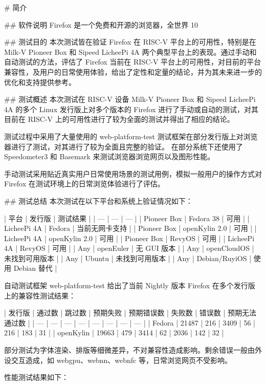 \documentclass{article}
\begin{document}
\begin{markdown}

# 简介

## 软件说明
Firefox 是一个免费和开源的浏览器，全世界 10%

## 测试目的
本次测试皆在验证 Firefox 在 RISC-V 平台上的可用性，特别是在 Milk-V Pioneer Box 和 Sipeed LicheePi 4A 两个典型平台上的表现。通过手动和自动测试的方法，评估了 Firefox 当前在 RISC-V 平台上的可用性，对目前的平台兼容性，及用户的日常使用体验，给出了定性和定量的结论，并为其未来进一步的优化和支持提供参考。

## 测试概述
本次测试在 RISC-V 设备 Milk-V Pioneer Box 和 Sipeed LicheePi 4A 的多个 Linux 发行版上对多个版本的 Firefox 进行了手动或自动的测试，对其目前在 RISC-V 上的可用性进行了较为全面的测试并得出了相应的结论。

测试过程中采用了大量使用的 web-platform-test 测试框架在部分发行版上对浏览器进行了测试，对其进行了较为全面且完整的验证。
在部分系统下还使用了 Speedometer3 和 Basemark 来测试浏览器浏览网页以及图形性能。

手动测试采用贴近真实用户日常使用场景的测试用例，模拟一般用户的操作方式对 Firefox 在测试环境上的日常浏览体验进行了评估。

## 测试总结
本次测试在以下平台和系统上验证情况如下：

| 平台 | 发行版 | 测试结果 |
| --- | --- | --- |
| Pioneer Box | Fedora 38 | 可用 |
| LicheePi 4A | Fedora | 当前无网卡支持 |
| Pioneer Box | openKylin 2.0 | 可用 |
| LicheePi 4A | openKylin 2.0 | 可用 |
| Pioneer Box | RevyOS | 可用 |
| LicheePi 4A | RevyOS | 可用 |
| Any | openEuler | 无 GUI 版本 |
| Any | openCloudOS | 未找到可用版本 |
| Any | Ubuntu | 未找到可用版本 |
| Any | Debian/RuyiOS | 使用 Debian 替代 | 

自动测试框架 web-platform-test 给出了当前 Nightly 版本 Firefox 在多个发行版上的兼容性测试结果：

| 发行版 | 通过数 | 跳过数 | 预期失败 | 预期错误数 | 失败数 | 错误数 | 预期无法通过数 |
| --- | --- | --- | --- | --- | --- | --- | --- |
| Fedora | 21487 | 216 | 3409 | 56 | 216 | 183 | 31 |
| openKylin | 19663 | 479 | 3414 | 62 | 2036 | 142 | 32 |

部分测试为字体渲染、排版等细微差异，不对兼容性造成影响。剩余错误一般由外设交互造成，如 webgpu、webnn、webnfc 等，日常浏览网页不受影响。

性能测试结果如下：


\end{markdown}
\end{document}
